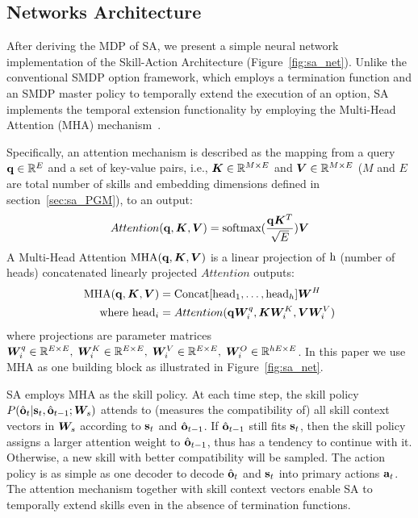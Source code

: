 \subsection{Networks Architecture}
\label{sec:net_arch}
After deriving the MDP of SA, we present a simple neural network
implementation of the Skill-Action Architecture
(Figure~\ref{fig:sa_net}). Unlike the conventional SMDP option
framework, which employs a termination function and an SMDP
master policy to temporally extend the execution of an option, SA
implements the temporal extension functionality by employing the
Multi-Head Attention (MHA) mechanism~\cite{vaswani2017attention}.

Specifically, an attention mechanism is described as the mapping
from a query ${\mathbf{q}}\in{\mathbb{R}}^{E}$ and a set of key-value pairs, i.e.,
${\bm{K}}\in{\mathbb{R}}^{M\times E}$ and ${\bm{V}}\in{\mathbb{R}}^{M\times E}$ ($M$ and $E$
are total number of skills and embedding dimensions defined in
section~\ref{sec:sa_PGM}), to an output:
\begin{equation}
  \label{eq:sa_net_attn}
Attention({\mathbf{q}},{\bm{K}},{\bm{V}}) = \text{softmax}(\frac{{\mathbf{q}}{\bm{K}}^T}{\sqrt{E}}){\bm{V}}
\end{equation}
A Multi-Head Attention $\text{MHA}({\mathbf{q}},{\bm{K}},{\bm{V}})$ is a linear
projection of ${\textnormal{h}}$ (number of heads) concatenated linearly
projected $Attention$ outputs:
\begin{align}
  \label{sa:sa_net_mha}
  \text{MHA}({\mathbf{q}},{\bm{K}},{\bm{V}}) &= \text{Concat}[\text{head}_1,\ldots,\text{head}_h]{\bm{W}}^H\\
  \nonumber \text{where head}_i &= Attention({\mathbf{q}}{\bm{W}}_i^q,{\bm{K}}{\bm{W}}_i^K,{\bm{V}}{\bm{W}}_i^V)
\end{align}
where projections are parameter matrices ${\bm{W}}_i^q\in{\mathbb{R}}^{E\times
  E},\;{\bm{W}}_i^K\in{\mathbb{R}}^{E\times E},\;{\bm{W}}_i^V\in{\mathbb{R}}^{E\times
  E},\;{\bm{W}}_i^O\in{\mathbb{R}}^{hE\times E}$. In this paper we use MHA as
one building block as illustrated in
Figure~\ref{fig:sa_net}.

SA employs MHA as the skill policy. At each time step, the skill
policy $P(\hat{{\mathbf{o}}}_t|{\mathbf{s}}_t,\hat{{\mathbf{o}}}_{t-1};{\bm{W}}_s)$ attends to
(measures the compatibility of) all skill context vectors in
${\bm{W}}_s$ according to ${\mathbf{s}}_t$ and $\hat{{\mathbf{o}}}_{t-1}$. If
$\hat{{\mathbf{o}}}_{t-1}$ still fits ${\mathbf{s}}_t$, then the skill policy
assigns a larger attention weight to $\hat{{\mathbf{o}}}_{t-1}$, thus has
a tendency to continue with it. Otherwise, a new skill with
better compatibility will be sampled. The action policy is as
simple as one decoder to decode $\hat{{\mathbf{o}}}_t$ and ${\mathbf{s}}_t$ into
primary actions ${\mathbf{a}}_t$. The attention mechanism together with
skill context vectors enable SA to temporally extend skills even
in the absence of termination functions.

